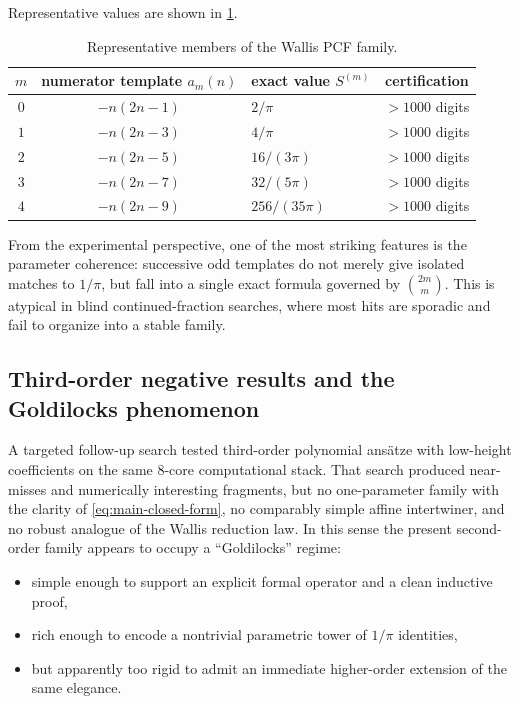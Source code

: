 \documentclass[11pt,reqno]{amsart}
\theoremstyle{plain}
\theoremstyle{definition}
\theoremstyle{remark}
\begin{document}
Representative values are shown in \cref{tab:values}.

\begin{table}[ht]
\centering
\caption{Representative members of the Wallis PCF family.}\label{tab:values}
\begin{tabular}{@{}cclc@{}}
\toprule
$m$ & numerator template $a_m(n)$ & exact value $S^{(m)}$ & certification \\
\midrule
$0$ & $-n(2n-1)$ & $2/\pi$ & $>1000$ digits \\
$1$ & $-n(2n-3)$ & $4/\pi$ & $>1000$ digits \\
$2$ & $-n(2n-5)$ & $16/(3\pi)$ & $>1000$ digits \\
$3$ & $-n(2n-7)$ & $32/(5\pi)$ & $>1000$ digits \\
$4$ & $-n(2n-9)$ & $256/(35\pi)$ & $>1000$ digits \\
\bottomrule
\end{tabular}
\end{table}

From the experimental perspective, one of the most striking features is the parameter coherence: successive odd templates do not merely give isolated matches to $1/\pi$, but fall into a single exact formula governed by $\binom{2m}{m}$.  This is atypical in blind continued-fraction searches, where most hits are sporadic and fail to organize into a stable family.

\subsection{Third-order negative results and the Goldilocks phenomenon}

A targeted follow-up search tested third-order polynomial ansätze with low-height coefficients on the same 8-core computational stack.  That search produced near-misses and numerically interesting fragments, but no one-parameter family with the clarity of \eqref{eq:main-closed-form}, no comparably simple affine intertwiner, and no robust analogue of the Wallis reduction law.  In this sense the present second-order family appears to occupy a ``Goldilocks'' regime:
\begin{itemize}
  \item simple enough to support an explicit formal operator and a clean inductive proof,
  \item rich enough to encode a nontrivial parametric tower of $1/\pi$ identities,
  \item but apparently too rigid to admit an immediate higher-order extension of the same elegance.
\end{itemize}
\end{document}
